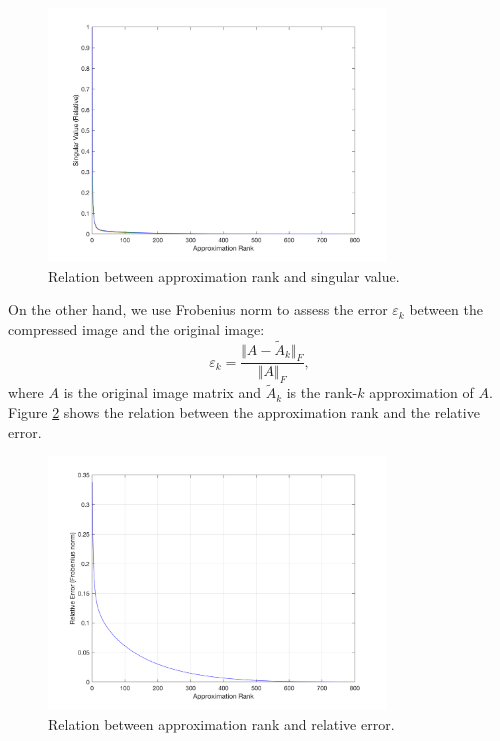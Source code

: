 \documentclass[12pt]{article}
\theoremstyle{definition}
\begin{document}
\begin{figure}
    \centering
    \includegraphics[width=0.8\textwidth]{ch2_figures/stat2.png}
    \caption{Relation between approximation rank and singular value.}
    \label{fig:singular_values}
\end{figure}

On the other hand, we use Frobenius norm to assess the error $\varepsilon_k$ between the compressed image and the original image:
\[ \varepsilon_k = \frac{\Vert A - \tilde{A}_k\Vert_F}{\Vert A\Vert_F}, \]
where $A$ is the original image matrix and $\tilde{A}_k$ is the rank-$k$ approximation of $A$. Figure \ref{fig:frob_norm} shows the relation between the approximation rank and the relative error.

\begin{figure}
    \centering
    \includegraphics[width=0.8\textwidth]{ch2_figures/stat1.png}
    \caption{Relation between approximation rank and relative error.}
    \label{fig:frob_norm}
\end{figure}
\end{document}
